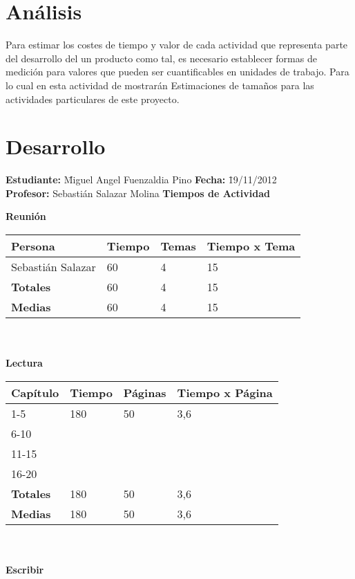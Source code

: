 \documentclass[a4paper,12pt,openany,oneside]{book}
\begin{document}
\section{Análisis}
Para estimar los costes de tiempo y valor de cada actividad que representa parte del desarrollo del un producto como tal, es necesario establecer formas de medición para valores que pueden ser cuantificables en unidades de trabajo. Para lo cual en esta actividad de mostrarán Estimaciones de tamaños para las actividades particulares de este proyecto.
\section{Desarrollo}
\newpage
\begin{tabbing}
\textbf{Estudiante:} \= Miguel Angel Fuenzaldia Pino \= \textbf{Fecha:} \= 19/11/2012\\
\textbf{Profesor:} \> Sebastián Salazar Molina \> \textbf{Tiempos de Actividad} \>  \\
\end{tabbing}
\textbf{Reunión}\\
\begin{tabular}{| l | l | l | l |}
\hline
\textbf{Persona} & \textbf{Tiempo} & \textbf{Temas} & \textbf{Tiempo x Tema}\\
\hline
Sebastián Salazar & 60 & 4 & 15\\
\hline
\textbf{Totales} & 60 & 4 & 15 \\
\hline
\textbf{Medias} & 60 & 4 & 15 \\
\hline
\end{tabular}
\\\\
\textbf{Lectura}\\
\begin{tabular}{| l | l | l | l |}
\hline
\textbf{Capítulo} & \textbf{Tiempo} & \textbf{Páginas} & \textbf{Tiempo x Página}\\
\hline
1-5   & 180 & 50 & 3,6 \\
\hline
6-10  & & & \\
\hline
11-15 & & & \\
\hline
16-20 & & & \\
\hline
\textbf{Totales} & 180 & 50 & 3,6 \\
\hline
\textbf{Medias} & 180 & 50 & 3,6 \\
\hline
\end{tabular}
\\\\
\textbf{Escribir}\\
\end{document}
